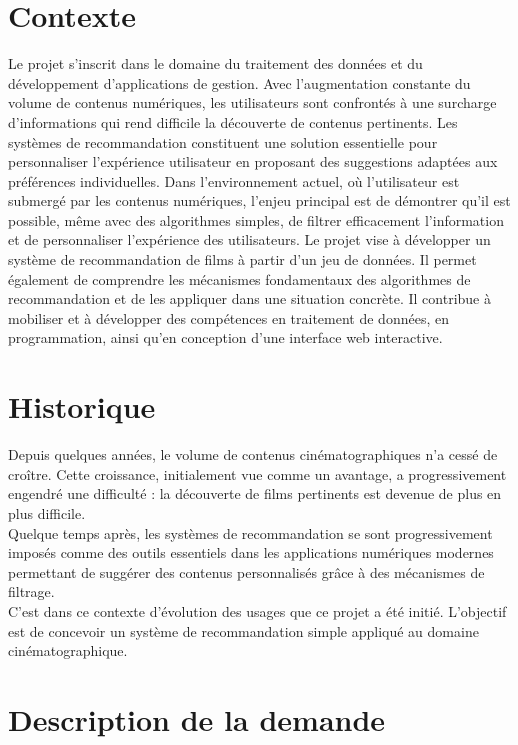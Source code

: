 \documentclass[a4paper,12pt]{report}
\begin{document}
\chapter{Contexte}
Le projet s'inscrit dans le domaine du traitement des données et du développement d'applications de gestion. Avec l'augmentation constante du volume de contenus numériques, les utilisateurs sont confrontés à une surcharge d'informations qui rend difficile la découverte de contenus pertinents. Les systèmes de recommandation constituent une solution essentielle pour personnaliser l'expérience utilisateur en proposant des suggestions adaptées aux préférences individuelles.
Dans l'environnement actuel, où l'utilisateur est submergé par les contenus numériques, l'enjeu principal est de démontrer qu'il est possible, même avec des algorithmes simples, de filtrer efficacement l'information et de personnaliser l'expérience des utilisateurs. Le projet vise à développer un système de recommandation de films à partir d'un jeu de données.
Il permet également de comprendre les mécanismes fondamentaux des algorithmes de recommandation et de les appliquer dans une situation concrète. Il contribue à mobiliser et à développer des compétences en traitement de données, en programmation, ainsi qu'en conception d'une interface web interactive.

\chapter{Historique}
Depuis quelques années, le volume de contenus cinématographiques n’a cessé de croître. Cette croissance, initialement vue comme un avantage, a progressivement engendré une difficulté : la découverte de films pertinents est devenue de plus en plus difficile.\\
Quelque temps après, les systèmes de recommandation se sont progressivement imposés comme des outils essentiels dans les applications numériques modernes permettant de suggérer des contenus personnalisés grâce à des mécanismes de filtrage.\\
C’est dans ce contexte d’évolution des usages que ce projet a été initié. L’objectif est de concevoir un système de recommandation simple appliqué au domaine cinématographique.


\chapter{Description de la demande}
\end{document}
